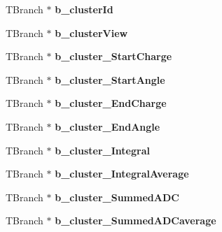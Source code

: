 \begin{DoxyCompactItemize}
\item 
\hypertarget{classanatree_ab8f7649098e53db2cae4786cd614215c}{T\-Branch $\ast$ {\bfseries b\-\_\-cluster\-Id}}\label{classanatree_ab8f7649098e53db2cae4786cd614215c}

\item 
\hypertarget{classanatree_a3dd99c1458502b95769e28e970ac4358}{T\-Branch $\ast$ {\bfseries b\-\_\-cluster\-View}}\label{classanatree_a3dd99c1458502b95769e28e970ac4358}

\item 
\hypertarget{classanatree_a6e674f8fed09644c85d76b31163ea638}{T\-Branch $\ast$ {\bfseries b\-\_\-cluster\-\_\-\-Start\-Charge}}\label{classanatree_a6e674f8fed09644c85d76b31163ea638}

\item 
\hypertarget{classanatree_a72c8b71bbd6fc4e96da67640c94f51e1}{T\-Branch $\ast$ {\bfseries b\-\_\-cluster\-\_\-\-Start\-Angle}}\label{classanatree_a72c8b71bbd6fc4e96da67640c94f51e1}

\item 
\hypertarget{classanatree_a5540328dd89b297a67f4c354e8abc598}{T\-Branch $\ast$ {\bfseries b\-\_\-cluster\-\_\-\-End\-Charge}}\label{classanatree_a5540328dd89b297a67f4c354e8abc598}

\item 
\hypertarget{classanatree_ad6e7df50c518750daa91c7f447ee9a04}{T\-Branch $\ast$ {\bfseries b\-\_\-cluster\-\_\-\-End\-Angle}}\label{classanatree_ad6e7df50c518750daa91c7f447ee9a04}

\item 
\hypertarget{classanatree_a4a45463d85ac0494284b863cf82d9416}{T\-Branch $\ast$ {\bfseries b\-\_\-cluster\-\_\-\-Integral}}\label{classanatree_a4a45463d85ac0494284b863cf82d9416}

\item 
\hypertarget{classanatree_a42c14008297e2742a79b13140d105054}{T\-Branch $\ast$ {\bfseries b\-\_\-cluster\-\_\-\-Integral\-Average}}\label{classanatree_a42c14008297e2742a79b13140d105054}

\item 
\hypertarget{classanatree_a1bb7cf91bff421bef31aaf87725e904f}{T\-Branch $\ast$ {\bfseries b\-\_\-cluster\-\_\-\-Summed\-A\-D\-C}}\label{classanatree_a1bb7cf91bff421bef31aaf87725e904f}

\item 
\hypertarget{classanatree_ab7023e11831e39619f69edf88400a0a7}{T\-Branch $\ast$ {\bfseries b\-\_\-cluster\-\_\-\-Summed\-A\-D\-Caverage}}\label{classanatree_ab7023e11831e39619f69edf88400a0a7}


\end{DoxyCompactItemize}
